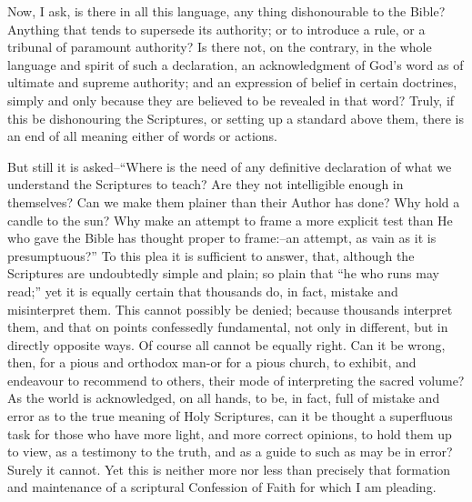\documentclass[
]{book}
\begin{document}
Now, I ask, is there in all this language, any thing dishonourable to the Bible? Anything that tends to supersede its authority; or to introduce a rule, or a tribunal of paramount authority? Is there not, on the contrary, in the whole language and spirit of such a declaration, an acknowledgment of God's word as of ultimate and supreme authority; and an expression of belief in certain doctrines, simply and only because they are believed to be revealed in that word? Truly, if this be dishonouring the Scriptures, or setting up a standard above them, there is an end of all meaning either of words or actions.

But still it is asked--``Where is the need of any definitive declaration of what we understand the Scriptures to teach? Are they not intelligible enough in themselves? Can we make them plainer than their Author has done? Why hold a candle to the sun? Why make an attempt to frame a more explicit test than He who gave the Bible has thought proper to frame:--an attempt, as vain as it is presumptuous?'' To this plea it is sufficient to answer, that, although the Scriptures are undoubtedly simple and plain; so plain that ``he who runs may read;'' yet it is equally certain that thousands do, in fact, mistake and misinterpret them. This cannot possibly be denied; because thousands interpret them, and that on points confessedly fundamental, not only in different, but in directly opposite ways. Of course all cannot be equally right. Can it be wrong, then, for a pious and orthodox man-or for a pious church, to exhibit, and endeavour to recommend to others, their mode of interpreting the sacred volume? As the world is acknowledged, on all hands, to be, in fact, full of mistake and error as to the true meaning of Holy Scriptures, can it be thought a superfluous task for those who have more light, and more correct opinions, to hold them up to view, as a testimony to the truth, and as a guide to such as may be in error? Surely it cannot. Yet this is neither more nor less than precisely that formation and maintenance of a scriptural Confession of Faith for which I am pleading.
\end{document}
